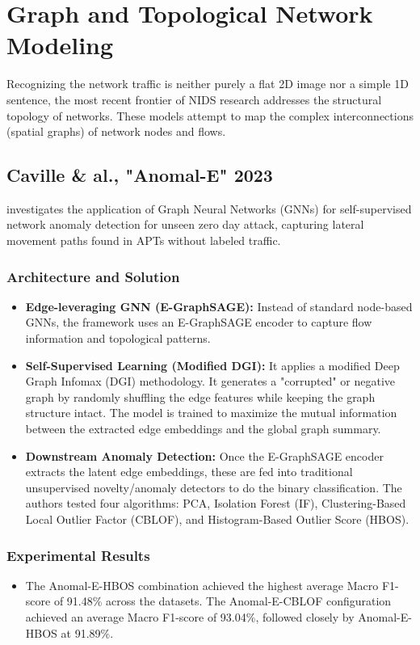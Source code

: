 \documentclass[12pt, a4paper]{report}
\begin{document}
\section{Graph and Topological Network Modeling}
Recognizing the network traffic is neither purely a flat 2D image nor a simple 1D sentence, the most recent frontier of NIDS research addresses the structural topology of networks. These models attempt to map the complex interconnections (spatial graphs) of network nodes and flows. 
\subsection{Caville \& al., "Anomal-E" 2023}
\cite{caville2023anomal} investigates the application of Graph Neural Networks (GNNs) for self-supervised network anomaly detection for unseen zero day attack, capturing lateral movement paths found in APTs without labeled traffic.

\subsubsection{Architecture and Solution}
\begin{itemize}
    \item \textbf{Edge-leveraging GNN (E-GraphSAGE):} Instead of standard node-based GNNs, the framework uses an E-GraphSAGE encoder to capture flow information and topological patterns.
    \item \textbf{Self-Supervised Learning (Modified DGI):} It applies a modified Deep Graph Infomax (DGI) methodology. It generates a "corrupted" or negative graph by randomly shuffling the edge features while keeping the graph structure intact. The model is trained to maximize the mutual information between the extracted edge embeddings and the global graph summary.
    \item \textbf{Downstream Anomaly Detection:} Once the E-GraphSAGE encoder extracts the latent edge embeddings, these are fed into traditional unsupervised novelty/anomaly detectors to do the binary classification. The authors tested four algorithms: PCA, Isolation Forest (IF), Clustering-Based Local Outlier Factor (CBLOF), and Histogram-Based Outlier Score (HBOS).
\end{itemize}

\subsubsection{Experimental Results}
\begin{itemize}
    \item The Anomal-E-HBOS combination achieved the highest average Macro F1-score of 91.48\% across the datasets. The Anomal-E-CBLOF configuration achieved an average Macro F1-score of 93.04\%, followed closely by Anomal-E-HBOS at 91.89\%.
\end{itemize}
\end{document}

